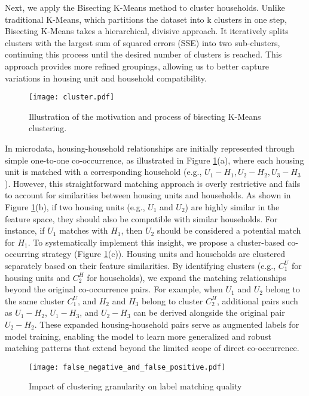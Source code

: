 \documentclass[]{nature_mod}
\begin{document}
Next, we apply the Bisecting K-Means method to cluster households. Unlike traditional K-Means, which partitions the dataset into k clusters in one step, Bisecting K-Means takes a hierarchical, divisive approach. It iteratively splits clusters with the largest sum of squared errors (SSE) into two sub-clusters, continuing this process until the desired number of clusters is reached. This approach provides more refined groupings, allowing us to better capture variations in housing unit and household compatibility.

\begin{figure}[!ht]
  \centering
  \texttt{[image: cluster.pdf]}
    \caption{Illustration of the motivation and process of bisecting K-Means clustering.}
  \label{fig:cluster}
\end{figure}

In microdata, housing-household relationships are initially represented through simple one-to-one co-occurrence, as illustrated in Figure \ref{fig:cluster}(a), where each housing unit is matched with a corresponding household (e.g., ${U_1-H_1, U_2-H_2, U_3-H_3}$). However, this straightforward matching approach is overly restrictive and fails to account for similarities between housing units and households. As shown in Figure \ref{fig:cluster}(b), if two housing units (e.g., $U_1$ and $U_2$) are highly similar in the feature space, they should also be compatible with similar households. For instance, if $U_1$ matches with $H_1$, then $U_2$ should be considered a potential match for $H_1$. To systematically implement this insight, we propose a cluster-based co-occurring strategy (Figure \ref{fig:cluster}(c)). Housing units and households are clustered separately based on their feature similarities. By identifying clusters (e.g., $C_1^U$ for housing units and $C_2^H$ for households), we expand the matching relationships beyond the original co-occurrence pairs. For example, when $U_1$ and $U_2$ belong to the same cluster $C_1^U$, and $H_2$ and $H_3$ belong to cluster $C_2^H$, additional pairs such as $U_1-H_2$, $U_1-H_3$, and $U_2-H_3$ can be derived alongside the original pair $U_2-H_2$. These expanded housing-household pairs serve as augmented labels for model training, enabling the model to learn more generalized and robust matching patterns that extend beyond the limited scope of direct co-occurrence.


\begin{figure}[!ht]
  \centering
  \texttt{[image: false\_negative\_and\_false\_positive.pdf]}
  \caption{Impact of clustering granularity on label matching quality}
  \label{fig:clustering_error}
\end{figure}
\end{document}
